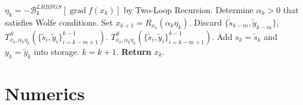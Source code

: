 \documentclass[9.4pt]{beamer}
\begin{document}
\begin{frame}
    \begin{algorithm}[H]
        \begin{algorithmic}[1]
            \State $\eta_k = - \mathcal{B}^{LRBFGS}_k [\operatorname{grad} f(x_k)]$ by Two-Loop Recursion.
            \State Determine $\alpha_k > 0$ that satisfies Wolfe conditions. 
            \State Set $x_{k+1} = R_{x_k}(\alpha_k \eta_k)$.
                \State Discard $\{ \widetilde{s}_{k-m}, \widetilde{y}_{k-m}\}$, $T^{S}_{x_k, \alpha_k \eta_k} (\{ \widetilde{s}_i, \widetilde{y}_i\}_{i=k-m+1}^{k-1})$.
			\Else 
				\State $T^{S}_{x_k, \alpha_k \eta_k} (\{ \widetilde{s}_i, \widetilde{y}_i\}_{i=k-m+1}^{k-1})$.
            \EndIf 
            \State Add $s_k = \widetilde{s}_k$ and $y_k = \widetilde{y}_k$ into storage.
            \State $k = k+1$.
        \EndWhile
        \State \textbf{Return} $x_k$.
        \end{algorithmic}
    \end{algorithm}
\end{frame}

\section{Numerics}
\end{document}
